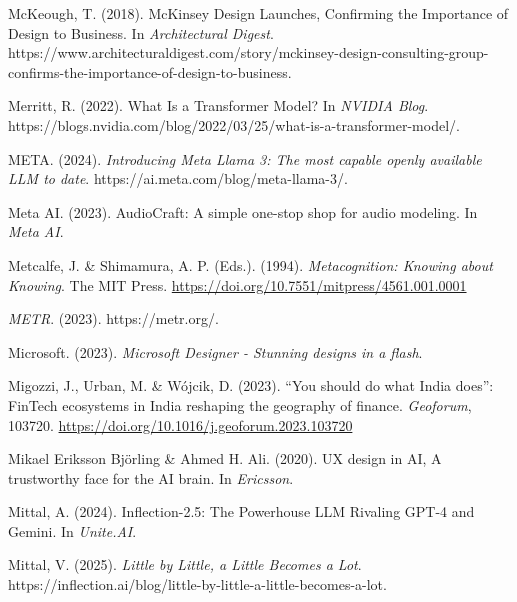 \documentclass[
  letterpaper,
  DIV=11,
  numbers=noendperiod]{scrartcl}
\newlength{\cslhangindent}
\newenvironment{CSLReferences}[2] %
 {\begin{list}{}{%
  \setlength{\itemindent}{0pt}
  \setlength{\leftmargin}{0pt}
  \setlength{\parsep}{0pt}
  \ifodd #1
   \setlength{\leftmargin}{\cslhangindent}
   \setlength{\itemindent}{-1\cslhangindent}
  \fi
  \setlength{\itemsep}{#2\baselineskip}}}
 {\end{list}}
\begin{document}
\begin{CSLReferences}{1}{0}
McKeough, T. (2018). {McKinsey Design Launches}, {Confirming} the
{Importance} of {Design} to {Business}. In \emph{Architectural Digest}.
https://www.architecturaldigest.com/story/mckinsey-design-consulting-group-confirms-the-importance-of-design-to-business.

Merritt, R. (2022). What {Is} a {Transformer Model}? In \emph{NVIDIA
Blog}.
https://blogs.nvidia.com/blog/2022/03/25/what-is-a-transformer-model/.

META. (2024). \emph{Introducing {Meta Llama} 3: {The} most capable
openly available {LLM} to date}. https://ai.meta.com/blog/meta-llama-3/.

Meta AI. (2023). {AudioCraft}: {A} simple one-stop shop for audio
modeling. In \emph{Meta AI}.

Metcalfe, J. \& Shimamura, A. P. (Eds.). (1994). \emph{Metacognition:
{Knowing} about {Knowing}}. The MIT Press.
\url{https://doi.org/10.7551/mitpress/4561.001.0001}

\emph{{METR}}. (2023). https://metr.org/.

Microsoft. (2023). \emph{Microsoft {Designer} - {Stunning} designs in a
flash}.

Migozzi, J., Urban, M. \& Wójcik, D. (2023). {``{You} should do what
{India} does''}: {FinTech} ecosystems in {India} reshaping the geography
of finance. \emph{Geoforum}, 103720.
\url{https://doi.org/10.1016/j.geoforum.2023.103720}

Mikael Eriksson Björling \& Ahmed H. Ali. (2020). {UX} design in {AI},
{A} trustworthy face for the {AI} brain. In \emph{Ericsson}.

Mittal, A. (2024). Inflection-2.5: {The Powerhouse LLM Rivaling GPT-4}
and {Gemini}. In \emph{Unite.AI}.

Mittal, V. (2025). \emph{Little by {Little}, a {Little Becomes} a
{Lot}}.
https://inflection.ai/blog/little-by-little-a-little-becomes-a-lot.


\end{CSLReferences}
\end{document}
